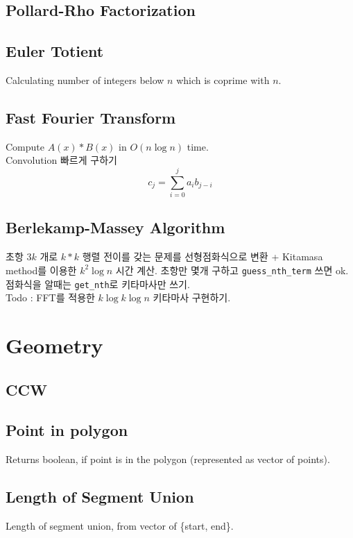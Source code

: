 \documentclass[landscape,8pt]{article}
\begin{document}
\begin{multicols}{2}
  \subsection{Pollard-Rho Factorization}
    

  \subsection{Euler Totient}
  Calculating number of integers below $n$ which is coprime with $n$.
    


  \subsection{Fast Fourier Transform}
    Compute $A(x) * B(x)$ in $O(n\log n)$ time.\\
    Convolution 빠르게 구하기 \[ c_j = \sum_{i = 0}^{j} a_i b_{j-i}\]
    
  \subsection{Berlekamp-Massey Algorithm}
    초항 $3k$ 개로 $k*k$ 행렬 전이를 갖는 문제를 선형점화식으로 변환 + Kitamasa method를 이용한 $k^2 \log n$ 시간 계산. 초항만 몇개 구하고 \texttt{guess\_nth\_term} 쓰면 ok. 점화식을 알때는 \texttt{get\_nth}로 키타마사만 쓰기.\\
    Todo : FFT를 적용한 $k \log k \log n$ 키타마사 구현하기.
    
\section{Geometry}
  \subsection{CCW}
    

  \subsection{Point in polygon}
    Returns boolean, if point is in the polygon (represented as vector of points).
    
  \subsection{Length of Segment Union}
    Length of segment union, from vector of \{start, end\}.
    

\end{multicols}
\end{document}
